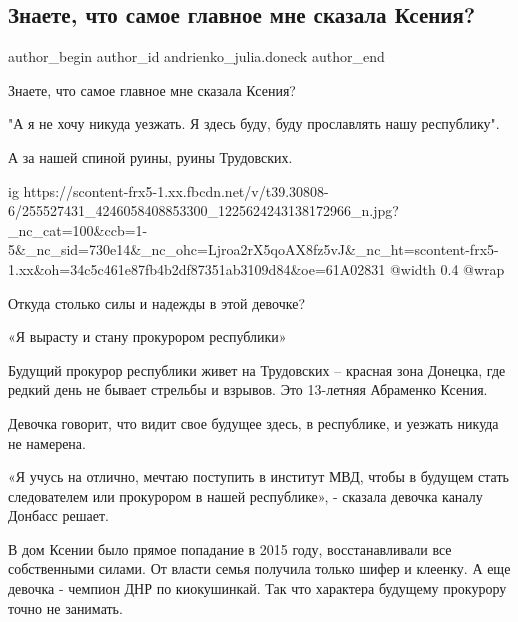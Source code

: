  
 
 
 
 
 
\subsection{Знаете, что самое главное мне сказала Ксения?}
\label{sec:15_11_2021.fb.andrienko_julia.doneck.1.ksenia_dnr_deti}
 
\ifcmt
 author_begin
   author_id andrienko_julia.doneck
 author_end
\fi

Знаете, что самое главное мне сказала Ксения? 

"А я не хочу никуда уезжать. Я здесь буду, буду прославлять нашу республику".

А за нашей спиной руины, руины Трудовских.

\ifcmt
  ig https://scontent-frx5-1.xx.fbcdn.net/v/t39.30808-6/255527431_4246058408853300_1225624243138172966_n.jpg?_nc_cat=100&ccb=1-5&_nc_sid=730e14&_nc_ohc=Ljroa2rX5qoAX8fz5vJ&_nc_ht=scontent-frx5-1.xx&oh=34c5c461e87fb4b2df87351ab3109d84&oe=61A02831
  @width 0.4
  @wrap 
\fi

Откуда столько силы и надежды в этой девочке?

«Я вырасту и стану прокурором республики»

Будущий прокурор республики живет на Трудовских – красная зона Донецка, где
редкий день не бывает стрельбы и взрывов. Это 13-летняя Абраменко Ксения.

Девочка говорит, что видит свое будущее здесь, в республике, и уезжать никуда
не намерена.

«Я учусь на отлично, мечтаю поступить в институт МВД, чтобы в будущем стать
следователем или прокурором в нашей республике», - сказала девочка каналу
Донбасс решает.

В дом Ксении было прямое попадание в 2015 году, восстанавливали все
собственными силами. От власти семья получила только шифер и клеенку. А еще
девочка - чемпион ДНР по киокушинкай. Так что характера будущему прокурору
точно не занимать.

